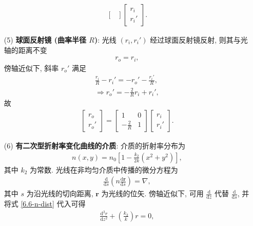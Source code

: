 \documentclass[twoside]{note}
\begin{document}
\begin{pf}
\begin{itemize}
\begin{align}
\begin{bmatrix}
            \end{bmatrix}\begin{bmatrix}
                r_i\\
                r_i'
            \end{bmatrix}.
        \end{align}
        \item[(5)] \textbf{球面反射镜 (曲率半径 $R$)}: 光线 $(r_i,r_i')$ 经过球面反射镜反射, 则其与光轴的距离不变
        \begin{align}
            r_o=r_i,
        \end{align}
        傍轴近似下, 斜率 $r_o'$ 满足
        \begin{gather}
            \frac{r_i}{R}-r_i'=-r_o'-\frac{r_i'}{R},\\
            \Longrightarrow r_o'=-\frac{2}{R}r_i+r_i',
        \end{gather}
        故
        \begin{align}
            \begin{bmatrix}
                r_o\\
                r_o'
            \end{bmatrix}=\begin{bmatrix}
                1&0\\
                -\frac{2}{R}&1
            \end{bmatrix}\begin{bmatrix}
                r_i\\
                r_i'
            \end{bmatrix}.
        \end{align}
        \item[(6)] \textbf{有二次型折射率变化曲线的介质}: 介质的折射率分布为
        \begin{align}
            \label{6.6-n-dist}
            n(x,y)=n_0\left[1-\frac{k_2}{2k}(x^2+y^2)\right],
        \end{align}
        其中 $k_2$ 为常数. 光线在非均匀介质中传播的微分方程为
        \begin{align}
            \frac{\mathrm{d}}{\mathrm{d}s}\left(n\frac{\mathrm{d}\bm{r}}{\mathrm{d}s}\right)=\nabla,
        \end{align}
        其中 $s$ 为沿光线的切向距离, $\bm{r}$ 为光线的位矢. 傍轴近似下, 可用 $\frac{\mathrm{d}}{\mathrm{d}z}$ 代替 $\frac{\mathrm{d}}{\mathrm{d}s}$, 并将式 \eqref{6.6-n-dist} 代入可得
        \begin{align}
            \frac{\mathrm{d}^2r}{\mathrm{d}z^2}+\left(\frac{k_2}{k}\right)r=0,

\end{align}
\end{itemize}
\end{pf}
\end{document}
